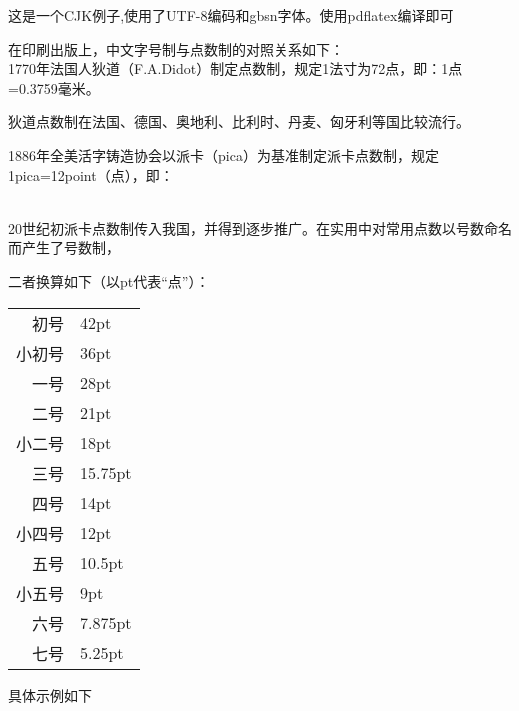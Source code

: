 \documentclass{article}
\newcommand{\chuhao}{\fontsize{42pt}{\baselineskip}\selectfont}
\newcommand{\xiaochuhao}{\fontsize{36pt}{\baselineskip}\selectfont}
\newcommand{\yihao}{\fontsize{28pt}{\baselineskip}\selectfont}
\newcommand{\erhao}{\fontsize{21pt}{\baselineskip}\selectfont}
\newcommand{\xiaoerhao}{\fontsize{18pt}{\baselineskip}\selectfont}
\newcommand{\sanhao}{\fontsize{15.75pt}{\baselineskip}\selectfont}
\newcommand{\sihao}{\fontsize{14pt}{\baselineskip}\selectfont}
\newcommand{\xiaosihao}{\fontsize{12pt}{\baselineskip}\selectfont}
\newcommand{\wuhao}{\fontsize{10.5pt}{\baselineskip}\selectfont}
\newcommand{\xiaowuhao}{\fontsize{9pt}{\baselineskip}\selectfont}
\newcommand{\liuhao}{\fontsize{7.875pt}{\baselineskip}\selectfont}
\newcommand{\qihao}{\fontsize{5.25pt}{\baselineskip}\selectfont}
\begin{document}
\begin{CJK}{UTF8}{gbsn}
这是一个CJK例子,使用了UTF-8编码和gbsn字体。使用pdflatex编译即可


在印刷出版上，中文字号制与点数制的对照关系如下：\\

 1770年法国人狄道（F.A.Didot）制定点数制，规定1法寸为72点，即：1点=0.3759毫米。

 狄道点数制在法国、德国、奥地利、比利时、丹麦、匈牙利等国比较流行。

 1886年全美活字铸造协会以派卡（pica）为基准制定派卡点数制，规定1pica=12point（点），即：

 \\

 20世纪初派卡点数制传入我国，并得到逐步推广。在实用中对常用点数以号数命名而产生了号数制，

 二者换算如下（以pt代表“点”）：\\

 \begin{center}

 \begin{tabular}{r@{\ =\ }l}

 初号& 42pt\\

 小初号& 36pt\\

 一号& 28pt\\

 二号& 21pt\\

 小二号& 18pt\\

 三号& 15.75pt\\

 四号& 14pt\\

 小四号& 12pt\\

 五号& 10.5pt\\

 小五号& 9pt\\

 六号 & 7.875pt\\

 七号 & 5.25pt

 \end{tabular}

 \end{center}


具体示例如下
\\
\\
\chuhao{初号小苹果}\\
\xiaochuhao{小初号小苹果}\\
\yihao{一号小苹果}\\
\erhao{二号小苹果}\\
\xiaoerhao{小二号小苹果}\\
\sanhao{三号小苹果}\\
\sihao{四号小苹果}\\
\xiaosihao{小四号小苹果}\\
\wuhao{五号小苹果}\\
\xiaowuhao{小五号小苹果}\\
\liuhao{六号小苹果}\\
\qihao{七号小苹果}\\

\end{CJK}
\end{document}
